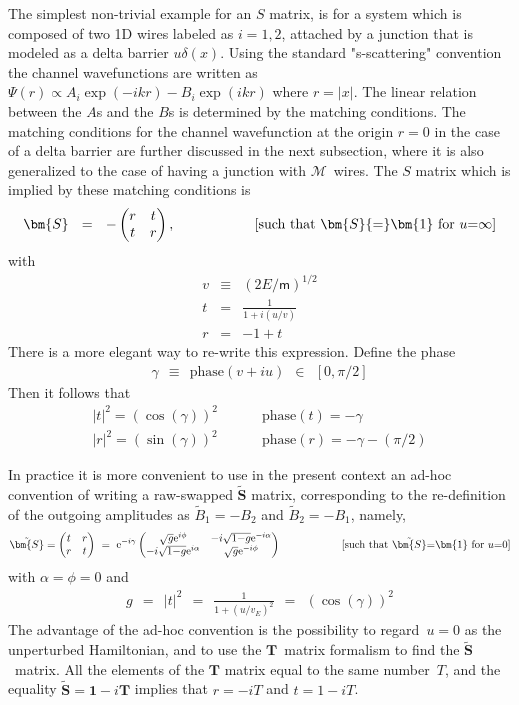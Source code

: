 \documentclass[onecolumn,fleqn]{revtex4}
\newcommand{\eexp}{\mathrm{e}^}
\newcommand{\mass}{\mathsf{m}}
\newcommand{\amatrix}[1]{\begin{matrix} #1 \end{matrix}}
\newcommand{\beq}{\begin{eqnarray}}
\newcommand{\eeq}{\end{eqnarray}}
\begin{document}
The simplest non-trivial example for an $S$ matrix, 
is for a system which is composed of two 1D wires 
labeled as ${i=1,2}$, attached by a junction
that is modeled as a delta barrier $u\delta(x)$.   
Using the standard "s-scattering" convention 
the channel wavefunctions are written 
as  ${\Psi(r) \propto A_i\exp(-ikr)-B_i\exp(ikr)}$ 
where ${r=|x|}$. The linear relation between 
the $A$s and the $B$s is determined by the 
matching conditions. The matching conditions 
for the channel wavefunction at the origin ${r=0}$ 
in the case of a delta barrier are further discussed 
in the next subsection, where it is also generalized 
to the case of having a junction with $\mathcal{M}$~wires.   
The $S$ matrix which is implied by these matching 
conditions is  
\beq
\bm{S} \ \ = \ \ -\left(
\amatrix{
r & t \cr
t & r
}\right), 
\ \ \ \ \ \ \ \ \ \ \ \ \ \ \ \ \  
\mbox{[such that $\bm{S}{=}\bm{1}$ for $u{=}\infty$]}
\eeq
with
\beq
v &\equiv& (2E/\mass)^{1/2} \\
t &=& \frac{1}{1+i(u/v)} \\
r &=& -1+t 
\eeq
There is a more elegant way to re-write this expression.
Define the phase 
\beq
\gamma \ \ \equiv \ \ \mbox{phase}(v+iu) \ \ \in \ \ [0,\pi/2]
\eeq
Then it follows that 
\beq
|t|^2 = (\cos(\gamma))^2  \ \ \ \ \ \ \ && \mbox{phase}(t) = -\gamma \\
|r|^2 = (\sin(\gamma))^2  \ \ \ \ \ \ \ && \mbox{phase}(r) = -\gamma -(\pi/2)
\eeq

In practice it is more convenient to use 
in the present context an ad-hoc convention 
of writing a raw-swapped $\tilde{\bm{S}}$ matrix,  
corresponding to the re-definition of the outgoing 
amplitudes as ${\tilde{B}_1=-B_2}$
and ${\tilde{B}_2=-B_1}$, namely, 
\beq
\tilde{\bm{S}} = \left(
\amatrix{
t & r \cr
r & t
}\right)
 \,\,=\,\,
\eexp{-i\gamma} \left(
\amatrix{
\sqrt{g} \eexp{i\phi}  & -i\sqrt{1{-}g}\eexp{-i\alpha} \cr
-i\sqrt{1{-}g}\eexp{i\alpha} & \sqrt{g}\eexp{-i\phi} 
}\right)
\ \ \ \ \ \ \ \ \ \ \ \ \ \ \ \ \  
\mbox{[such that $\tilde{\bm{S}}{=}\bm{1}$ for $u{=}0$]}
\eeq
with $\alpha=\phi=0$ and 
\beq
g \ \ = \ \ |t|^2 \ \ = \ \ \frac{1}{1+(u/v_E)^2} \ \ = \ \ (\cos(\gamma))^2 
\eeq
The advantage of the ad-hoc convention 
is the possibility to regard~${u=0}$ as 
the unperturbed Hamiltonian, and to use 
the $\bm{T}$~matrix formalism to find the $\tilde{\bm{S}}$~matrix.
All the elements of the $\bm{T}$ matrix equal 
to the same number~$T$, and the equality 
${\tilde{\bm{S}}=\bm{1}-i\bm{T}}$ implies 
that ${r=-iT}$ and ${t=1-iT}$.
\end{document}
